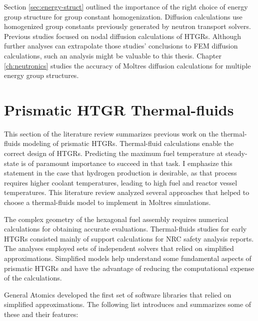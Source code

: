 Section \ref{sec:energy-struct} outlined the importance of the right choice of energy group structure for group constant homogenization.
Diffusion calculations use homogenized group constants previously generated by neutron transport solvers.
Previous studies focused on nodal diffusion calculations of HTGRs.
Although further analyses can extrapolate those studies' conclusions to FEM diffusion calculations, such an analysis might be valuable to this thesis.
Chapter \ref{ch:neutronics} studies the accuracy of Moltres diffusion calculations for multiple energy group structures.

\section{Prismatic HTGR Thermal-fluids}
\label{sec:litrev-thermalf}

This section of the literature review summarizes previous work on the thermal-fluids modeling of prismatic HTGRs.
Thermal-fluid calculations enable the correct design of \glspl{HTGR}.
Predicting the maximum fuel temperature at steady-state is of paramount importance to succeed in that task.
I emphasize this statement in the case that hydrogen production is desirable, as that process requires higher coolant temperatures, leading to high fuel and reactor vessel temperatures.
This literature review analyzed several approaches that helped to choose a thermal-fluids model to implement in Moltres simulations.

The complex geometry of the hexagonal fuel assembly requires numerical calculations for obtaining accurate evaluations.
Thermal-fluids studies for early \glspl{HTGR} consisted mainly of support calculations for \gls{NRC} safety analysis reports.
The analyses employed sets of independent solvers that relied on simplified approximations.
Simplified models help understand some fundamental aspects of prismatic HTGRs and have the advantage of reducing the computational expense of the calculations.

General Atomics \cite{shenoy_htgr_1974} developed the first set of software libraries that relied on simplified approximations.
The following list introduces and summarizes some of these and their features:

